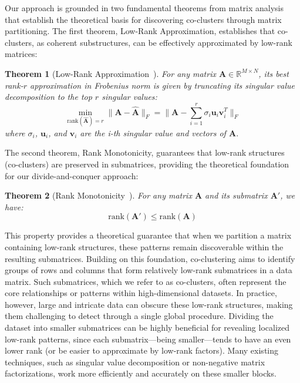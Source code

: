\documentclass[journal]{IEEEtran}
\newtheorem{theorem}{Theorem}
\renewcommand{\cite}[1]{~\autocite{#1}}
\begin{document}
Our approach is grounded in two fundamental theorems from matrix analysis that establish the theoretical basis for discovering co-clusters through matrix partitioning. The first theorem, Low-Rank Approximation, establishes that co-clusters, as coherent substructures, can be effectively approximated by low-rank matrices:

\begin{theorem}[Low-Rank Approximation\cite{eckart1936ApproximationOneMatrix}] \label{thm:low-rank-approximation}
    For any matrix $\mathbf{A} \in \mathbb{R}^{M \times N}$, its best rank-$r$ approximation in Frobenius norm is given by truncating its singular value decomposition to the top $r$ singular values:
    \begin{equation}
        \min_{\text{rank}(\hat{\mathbf{A}})=r} \|\mathbf{A} - \hat{\mathbf{A}}\|_F = \|\mathbf{A} - \sum_{i=1}^r \sigma_i \mathbf{u}_i\mathbf{v}_i^T\|_F
    \end{equation}
    where $\sigma_i$, $\mathbf{u}_i$, and $\mathbf{v}_i$ are the i-th singular value and vectors of $\mathbf{A}$.
\end{theorem}

The second theorem, Rank Monotonicity, guarantees that low-rank structures (co-clusters) are preserved in submatrices, providing the theoretical foundation for our divide-and-conquer approach:

\begin{theorem}[Rank Monotonicity\cite{horn1985MatrixAnalysis}] \label{thm:rank-monotonicity}
    For any matrix $\mathbf{A}$ and its submatrix $\mathbf{A}'$, we have:
    \begin{equation}
        \text{rank}(\mathbf{A}') \leq \text{rank}(\mathbf{A})
    \end{equation}
\end{theorem}

This property provides a theoretical guarantee that when we partition a matrix containing low-rank structures, these patterns remain discoverable within the resulting submatrices. Building on this foundation, co-clustering aims to identify groups of rows and columns that form relatively low-rank submatrices in a data matrix. Such submatrices, which we refer to as co-clusters, often represent the core relationships or patterns within high-dimensional datasets. In practice, however, large and intricate data can obscure these low-rank structures, making them challenging to detect through a single global procedure. Dividing the dataset into smaller submatrices can be highly beneficial for revealing localized low-rank patterns, since each submatrix—being smaller—tends to have an even lower rank (or be easier to approximate by low-rank factors). Many existing techniques, such as singular value decomposition or non-negative matrix factorizations, work more efficiently and accurately on these smaller blocks.
\end{document}
